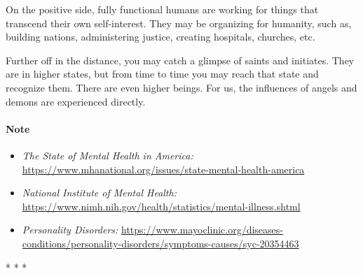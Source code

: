 On the positive side, fully functional humans are working for things that transcend their own self-interest. They may be organizing for humanity, such as, building nations, administering justice, creating hospitals, churches, etc.

Further off in the distance, you may catch a glimpse of saints and initiates. They are in higher states, but from time to time you may reach that state and recognize them. There are even higher beings. For us, the influences of angels and demons are experienced directly.

\paragraph{Note}

\begin{itemize}
\item\textit{The State of Mental Health in America:} \url{https://www.mhanational.org/issues/state-mental-health-america}

\item\textit{National Institute of Mental Health:} \url{https://www.nimh.nih.gov/health/statistics/mental-illness.shtml}

\item\textit{Personality Disorders:} \url{https://www.mayoclinic.org/diseases-conditions/personality-disorders/symptoms-causes/syc-20354463}
\end{itemize}



\begin{center}* * *\end{center}

